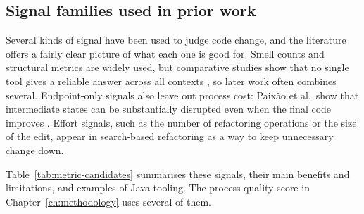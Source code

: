 \subsection{Signal families used in prior work}
Several kinds of signal have been used to judge code change, and the literature offers a fairly clear picture of what each one is good for. Smell counts and structural metrics are widely used, but comparative studies show that no single tool gives a reliable answer across all contexts \cite{paiva2017evaluation,arcellifontana2016falsepositives}, so later work often combines several. Endpoint-only signals also leave out process cost: Paix{\~a}o et al.\ show that intermediate states can be substantially disrupted even when the final code improves \cite{paixao2017balancing}. Effort signals, such as the number of refactoring operations or the size of the edit, appear in search-based refactoring \cite{harman2007pareto,mohan2019manyobjective} as a way to keep unnecessary change down.

Table~\ref{tab:metric-candidates} summarises these signals, their main benefits and limitations, and examples of Java tooling. The process-quality score in Chapter~\ref{ch:methodology} uses several of them.

